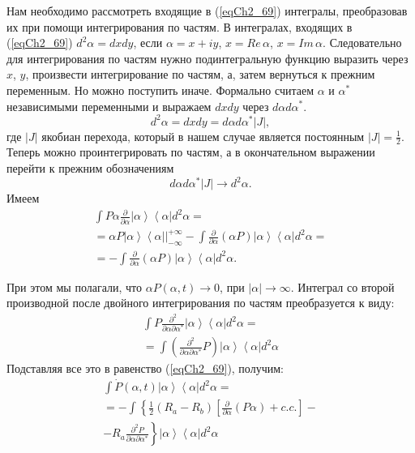 Нам необходимо рассмотреть входящие в (\ref{eqCh2_69}) интегралы,
преобразовав их при помощи интегрирования по частям.
В интегралах, входящих в (\ref{eqCh2_69}) $d^2\alpha = dx dy$, если
$\alpha = x + i y$, $x = Re\,\alpha$, $x = Im\,\alpha$.
Следовательно для интегрирования по частям нужно подинтегральную
функцию выразить через $x$, $y$, произвести интегрирование по частям,
а, затем вернуться к прежним переменным. Но можно поступить
иначе. Формально считаем $\alpha$ и $\alpha^{*}$ независимыми
переменными и выражаем $dx dy$ через $d\alpha d\alpha^{*}$.
\[
d^2\alpha = dx dy = d\alpha d\alpha^{*} \left|J\right|,
\]
где $\left|J\right|$ якобиан перехода, который в нашем случае является
постоянным $\left|J\right| = \frac{1}{2}$. Теперь можно
проинтегрировать по частям, а в окончательном выражении перейти к
прежним обозначениям 
\[
d\alpha d\alpha^{*} \left|J\right| \rightarrow d^2\alpha.
\]
 Имеем  
\begin{eqnarray}
\int P \alpha \frac{\partial}{\partial \alpha}
\left|\alpha\right>\left<\alpha\right| 
d^2 \alpha = 
\nonumber \\
= \left.\alpha P \left|\alpha\right>\left<\alpha\right|
\right|_{-\infty}^{+\infty} - 
\int \frac{\partial}{\partial \alpha}\left(\alpha P\right)
\left|\alpha\right>\left<\alpha\right|d^2 \alpha = 
\nonumber \\
= 
- \int \frac{\partial}{\partial \alpha}\left(\alpha P\right)
\left|\alpha\right>\left<\alpha\right|d^2 \alpha.
\label{eqCh2_70}
\end{eqnarray}

При этом мы полагали, что $\alpha P\left(\alpha, t\right) \rightarrow
0$, при $\left|\alpha\right| \rightarrow \infty$.  Интеграл со второй
производной после двойного интегрирования по частям преобразуется к
виду: 
\begin{eqnarray}
\int P \frac{\partial^2}{\partial \alpha \partial \alpha^{*}}
\left|\alpha\right>\left<\alpha\right| 
d^2 \alpha = 
\nonumber \\
= \int \left(\frac{\partial^2}{\partial \alpha \partial \alpha^{*}}
P\right) \left|\alpha\right>\left<\alpha\right|  
d^2 \alpha
\label{eqCh2_71}
\end{eqnarray}
Подставляя все это в равенство (\ref{eqCh2_69}), получим:
\begin{eqnarray}
\int \dot{P} \left(\alpha, t\right) 
\left|\alpha\right>\left<\alpha\right| 
d^2 \alpha = 
\nonumber \\
= - \int \left\{
\frac{1}{2}\left(R_a - R_b\right)
\left[
\frac{\partial}{\partial \alpha}
\left(P \alpha\right) + c.c.
\right]
\right.
-
\nonumber \\
- \left.
R_a \frac{\partial^2 P}{\partial \alpha \partial \alpha^{*}}
\right\}
\left|\alpha\right>\left<\alpha\right| 
d^2 \alpha
\label{eqCh2_72}
\end{eqnarray}

